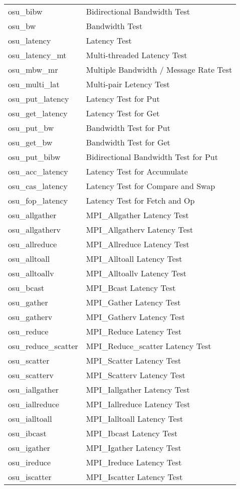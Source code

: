 \begin{center}
\begin{tabular}{ll}
osu\_bibw & Bidirectional Bandwidth Test\\
osu\_bw & Bandwidth Test\\
osu\_latency & Latency Test\\
osu\_latency\_mt & Multi-threaded Latency Test\\
osu\_mbw\_mr & Multiple Bandwidth / Message Rate Test \\
osu\_multi\_lat & Multi-pair Letency Test \\ 
osu\_put\_latency & Latency Test for Put \\
osu\_get\_latency & Latency Test for Get \\
osu\_put\_bw & Bandwidth Test for Put \\
osu\_get\_bw & Bandwidth Test for Get \\
osu\_put\_bibw & Bidirectional Bandwidth Test for Put \\
osu\_acc\_latency & Latency Test for Accumulate \\
osu\_cas\_latency & Latency Test for Compare and Swap \\
osu\_fop\_latency & Latency Test for Fetch and Op \\
osu\_allgather & MPI\_Allgather Latency Test \\
osu\_allgatherv & MPI\_Allgatherv Latency Test \\
osu\_allreduce & MPI\_Allreduce Latency Test \\
osu\_alltoall & MPI\_Alltoall Latency Test \\
osu\_alltoallv & MPI\_Alltoallv Latency Test \\
osu\_bcast & MPI\_Bcast Latency Test \\
osu\_gather & MPI\_Gather Latency Test \\ 
osu\_gatherv & MPI\_Gatherv Latency Test \\
osu\_reduce & MPI\_Reduce Latency Test \\
osu\_reduce\_scatter & MPI\_Reduce\_scatter Latency Test \\
osu\_scatter & MPI\_Scatter Latency Test \\
osu\_scatterv & MPI\_Scatterv Latency Test \\
osu\_iallgather & MPI\_Iallgather Latency Test \\
osu\_iallreduce & MPI\_Iallreduce Latency Test \\
osu\_ialltoall & MPI\_Ialltoall Latency Test \\
osu\_ibcast & MPI\_Ibcast Latency Test \\
osu\_igather & MPI\_Igather Latency Test \\
osu\_ireduce & MPI\_Ireduce Latency Test \\
osu\_iscatter & MPI\_Iscatter Latency Test
\end{tabular}
\end{center}

